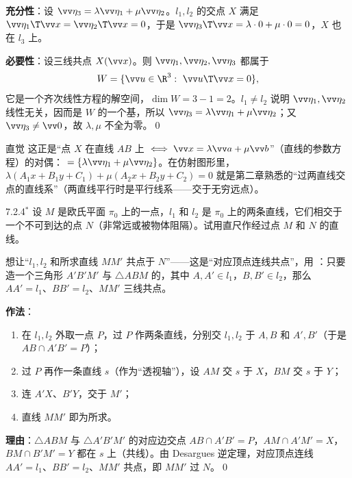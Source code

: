 \textbf{充分性}：设 $\vv\eta_3=\lambda\vv\eta_1+\mu\vv\eta_2$。$l_1,l_2$ 的交点 $X$ 满足 $\vv\eta_1\T\vv x=\vv\eta_2\T\vv x=0$，于是 $\vv\eta_3\T\vv x=\lambda\cdot0+\mu\cdot0=0$，$X$ 也在 $l_3$ 上。

\textbf{必要性}：设三线共点 $X(\vv x)$。则 $\vv\eta_1,\vv\eta_2,\vv\eta_3$ 都属于
\[
W=\{\vv u\in\R^3:\ \vv u\T\vv x=0\},
\]
它是一个齐次线性方程的解空间，$\dim W=3-1=2$。$l_1\neq l_2$ 说明 $\vv\eta_1,\vv\eta_2$ 线性无关，因而是 $W$ 的一个基，所以 $\vv\eta_3=\lambda\vv\eta_1+\mu\vv\eta_2$；又 $\vv\eta_3\neq\vv0$，故 $\lambda,\mu$ 不全为零。\qed

\begin{intbox}{直觉}
这正是“点 $X$ 在直线 $AB$ 上 $\iff \vv x=\lambda\vv a+\mu\vv b$”（直线的参数方程）的对偶： $=\{\lambda\vv\eta_1+\mu\vv\eta_2\}$。在仿射图形里，$\lambda(A_1x+B_1y+C_1)+\mu(A_2x+B_2y+C_2)=0$ 就是第二章熟悉的“过两直线交点的直线系”（两直线平行时是平行线系——交于无穷远点）。
\end{intbox}

\begin{ex}{7.2.4$^*$}
设 $M$ 是欧氏平面 $\pi_0$ 上的一点，$l_1$ 和 $l_2$ 是 $\pi_0$ 上的两条直线，它们相交于一个不可到达的点 $N$（非常远或被物体阻隔）。试用直尺作经过点 $M$ 和 $N$ 的直线。
\end{ex}
\fenxi 想让“$l_1,l_2$ 和所求直线 $MM'$ 共点于 $N$”——这是“对应顶点连线共点”，用 ：只要造一个三角形 $A'B'M'$ 与 $\triangle ABM$ 的，其中 $A,A'\in l_1$，$B,B'\in l_2$，那么 $AA'=l_1$、$BB'=l_2$、$MM'$ 三线共点。

\jie\textbf{作法}：
\begin{enumerate}
\item 在 $l_1,l_2$ 外取一点 $P$，过 $P$ 作两条直线，分别交 $l_1,l_2$ 于 $A,B$ 和 $A',B'$（于是 $AB\cap A'B'=P$）；
\item 过 $P$ 再作一条直线 $s$（作为“透视轴”），设 $AM$ 交 $s$ 于 $X$，$BM$ 交 $s$ 于 $Y$；
\item 连 $A'X$、$B'Y$，交于 $M'$；
\item 直线 $MM'$ 即为所求。
\end{enumerate}
\textbf{理由}：$\triangle ABM$ 与 $\triangle A'B'M'$ 的对应边交点 $AB\cap A'B'=P$，$AM\cap A'M'=X$，$BM\cap B'M'=Y$ 都在 $s$ 上（共线）。由 Desargues 逆定理，对应顶点连线 $AA'=l_1$、$BB'=l_2$、$MM'$ 共点，即 $MM'$ 过 $N$。\qed

